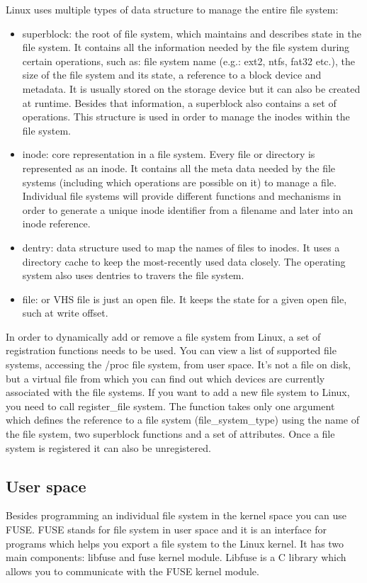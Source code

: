         Linux uses multiple types of data structure to manage the entire file system:
        \begin{itemize}
            \item superblock: the root of file system, which maintains and describes state in the file system. It contains all the information needed by the file system during certain operations, such as: file system name (e.g.: ext2, ntfs, fat32 etc.), the size of the file system and its state, a reference to a block device and metadata. It is usually stored on the storage device but it can also be created at runtime. Besides that information, a superblock also contains a set of operations. This structure is used in order to manage the inodes within the file system.
            \item inode: core representation in a file system. Every file or directory is represented as an inode.
            It contains all the meta data needed by the file systems (including which operations are possible on it) to manage a file. Individual file systems will provide different functions and mechanisms in order to generate a unique inode identifier from a filename and later into an inode reference.
            \item dentry: data structure used to map the names of files to inodes. It uses a directory cache to keep the most-recently used data closely. The operating system also uses dentries to travers the file system.
            \item file: or VHS file is just an open file. It keeps the state for a given open file, such at write offset.
        \end{itemize}

        In order to dynamically add or remove a file system from Linux, a set of registration functions needs to be used. You can view a list of supported file systems, accessing the /proc file system, from user space. It's not a file on disk, but a virtual file from which you can find out which devices are currently associated with the file systems. If you want to add a new file system to Linux, you need to call register\_file system. The function takes only one argument which defines the reference to a file system (file\_system\_type) using the name of the file system, two superblock functions and a set of attributes. Once a file system is registered it can also be unregistered.

    \subsection{User space}
        Besides programming an individual file system in the kernel space you can use FUSE. FUSE stands for file system in user space and it is an interface for programs which helps you export a file system to the Linux kernel. It has two main components: libfuse and fuse kernel module. Libfuse is a C library which allows you to communicate with the FUSE kernel module.
        
